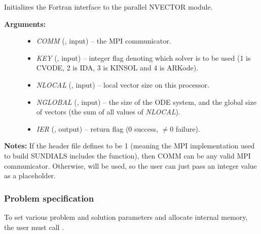 \documentclass[letterpaper,10pt,english]{sphinxmanual}
\begin{document}
\begin{fulllineitems}
\label{f_interface/Usage:f/_/FNVINITP}
Initializes the Fortran interface to the parallel NVECTOR module.
\begin{description}
\item[{\textbf{Arguments:}}] \leavevmode\begin{itemize}
\item {} 
\emph{COMM} (, input) -- the MPI communicator.

\item {} 
\emph{KEY} (, input) -- integer flag denoting which solver is to be
used (1 is CVODE, 2 is IDA, 3 is KINSOL and 4 is ARKode).

\item {} 
\emph{NLOCAL} (, input) -- local vector size on this processor.

\item {} 
\emph{NGLOBAL} (, input) -- the size of the ODE system,
and the global size of vectors (the sum of all values of \emph{NLOCAL}).

\item {} 
\emph{IER} (, output) -- return flag (0 success, $\ne 0$ failure).

\end{itemize}

\end{description}

\textbf{Notes:} If the header file  defines
 to be 1 (meaning the MPI implementation
used to build SUNDIALS includes the  function),
then COMM can be any valid MPI communicator.  Otherwise,
 will be used, so the user can just pass an
integer value as a placeholder.

\end{fulllineitems}



\subsubsection{Problem specification}
\label{f_interface/Usage:problem-specification}\label{f_interface/Usage:finterface-problem}
To set various problem and solution parameters and allocate internal
memory, the user must call {\hyperref[f_interface/Usage:f/_/FARKMALLOC]{}}.
\end{document}
